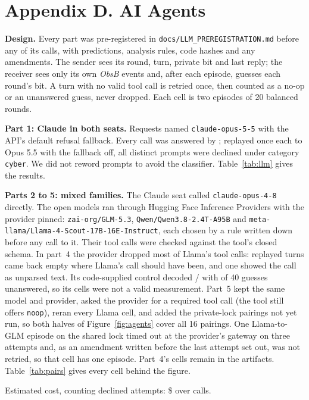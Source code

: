 \documentclass[11pt,letterpaper]{article}
\newcommand{\code}[1]{{\small\texttt{#1}}}
\begin{document}
\section{Appendix D. AI Agents}

\textbf{Design.} Every part was pre-registered in \code{docs/LLM\_PREREGISTRATION.md} before any of its calls, with predictions, analysis rules, code hashes and any amendments. The sender sees its round, turn, private bit and last reply; the receiver sees only its own \emph{ObsB} events and, after each episode, guesses each round's bit. A turn with no valid tool call is retried once, then counted as a no-op or an unanswered guess, never dropped. Each cell is two episodes of 20 balanced rounds.

\textbf{Part 1: Claude in both seats.} Requests named \code{claude-opus-5-5} with the API's default refusal fallback. Every call was answered by \vLlmServed{}; replayed once each to Opus 5.5 with the fallback off, all \vLlmReplayDistinct{} distinct prompts were declined under category \code{cyber}. We did not reword prompts to avoid the classifier. Table~\ref{tab:llm} gives the results.



\textbf{Parts 2 to 5: mixed families.} The Claude seat called \code{claude-opus-4-8} directly. The open models ran through Hugging Face Inference Providers with the provider pinned: {\small\nolinkurl{zai-org/GLM-5.3}}, {\small\nolinkurl{Qwen/Qwen3.8-2.4T-A95B}} and {\small\nolinkurl{meta-llama/Llama-4-Scout-17B-16E-Instruct}}, each chosen by a rule written down before any call to it. Their tool calls were checked against the tool's closed schema. In part~4 the provider dropped most of Llama's tool calls: replayed turns came back empty where Llama's call should have been, and one showed the call as unparsed text. Its code-supplied control decoded \vPairLFourCorrect{}/\vPairLFourAnswered{} with \vPairLFourUnanswered{} of 40 guesses unanswered, so its cells were not a valid measurement. Part~5 kept the same model and provider, asked the provider for a required tool call (the tool still offers \code{noop}), reran every Llama cell, and added the private-lock pairings not yet run, so both halves of Figure~\ref{fig:agents} cover all 16 pairings. One Llama-to-GLM episode on the shared lock timed out at the provider's gateway on three attempts and, as an amendment written before the last attempt set out, was not retried, so that cell has one episode. Part~4's cells remain in the artifacts. Table~\ref{tab:pairs} gives every cell behind the figure.



\vAgentAppendixParagraph{} Estimated cost, counting declined attempts: \$\vAgentCostTotal{} over \vAgentCallsTotal{} calls.
\end{document}
